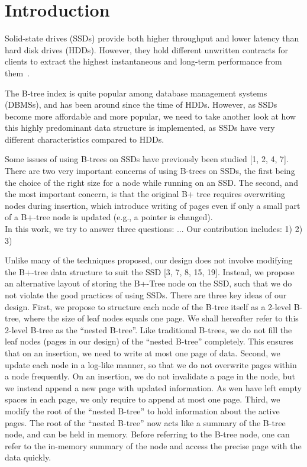 
\section{Introduction}
Solid-state drives (SSDs) provide both higher throughput and lower latency than hard disk drives (HDDs).
However, they hold different unwritten contracts for clients to extract the highest instantaneous and long-term performance from them~\cite{he2017unwritten}.

The B-tree index is quite popular among database management systems (DBMSs), and has been around since the time of HDDs.
However, as SSDs become more affordable and more popular, we need to take another look at how this highly predominant data structure is implemented, as SSDs have very different characteristics compared to HDDs.

Some issues of using B-trees on SSDs have previously been studied [1, 2, 4, 7].
There are two very important concerns of using B-trees on SSDs, the first being the choice of the right size for a node while running on an SSD.
The second, and the most important concern, is that the original B+ tree requires overwriting nodes during insertion, which introduce writing of pages even if only a small part of a B+-tree node is updated (e.g., a pointer is changed).\\

In this work, we try to answer three questions: ... Our contribution includes:
1)
2)
3)

\iffalse
Unlike many of the techniques proposed, our design does not involve modifying the B+-tree data structure to suit the
SSD [3, 7, 8, 15, 19].
Instead, we propose an alternative layout of storing the B+-Tree node on the SSD, such that we do not violate the good practices of using SSDs.
There are three key ideas of our design.
First, we propose to structure each node of the B-tree itself as a 2-level B-tree, where the size of leaf nodes equals one page.
We shall hereafter refer to this 2-level B-tree as the “nested B-tree”.
Like traditional B-trees, we do not fill the leaf nodes (pages in our design) of the “nested B-tree” completely.
This ensures that on an insertion, we need to write at most one page of data.
Second, we update each node in a log-like manner, so that we do not overwrite pages within a node frequently.
On an insertion, we do not invalidate a page in the node, but we instead append a new page with updated information.
As wen have left empty spaces in each page, we only require to append at most one page.
Third, we modify the root of the “nested B-tree” to hold information about the active pages.
The root of the “nested B-tree” now acts like a summary of the B-tree node, and can be held in memory.
Before referring to the B-tree node, one can refer to the in-memory summary of the node and access the precise page with the data quickly.\\

